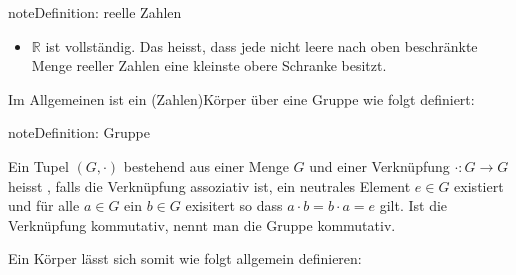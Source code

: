 \documentclass[letterpaper,10pt,english]{jupyterBook}
\begin{document}
\begin{sphinxadmonition}{note}{Definition: reelle Zahlen}
\begin{itemize}
\begin{itemize}
\begin{enumerate}
\item {} 
Für je zwei Elemente \(x,y \in\mathbb{R}\) gilt
\begin{equation*}
\begin{split}x \le y\quad \text{oder}\quad y\le x.\end{split}
\end{equation*}
\end{enumerate}

\item {} 
Die Ordnung ist verträglich mit Addition und Multiplikation, d.h. für \(a,b,c\in\mathbb{R}\) gilt

\end{itemize}
\begin{equation*}
\begin{split}\begin{array}{c}
  a \le b \Rightarrow a+c \le b+c\\
  a \le b, 0 \le c \Rightarrow a\cdot c \le b\cdot c
  \end{array}\end{split}
\end{equation*}
\item {} 
\(\mathbb{R}\) ist vollständig. Das heisst, dass jede nicht leere nach oben beschränkte Menge reeller Zahlen eine kleinste obere Schranke besitzt.

\end{itemize}
\end{sphinxadmonition}

Im Allgemeinen ist ein (Zahlen)\sphinxhyphen{}Körper über eine Gruppe wie folgt definiert:

\begin{sphinxadmonition}{note}{Definition: Gruppe}

Ein Tupel \((G, \cdot)\) bestehend aus einer Menge \(G\) und einer Verknüpfung \(\cdot : G \to G\) heisst , falls die Verknüpfung assoziativ ist, ein neutrales Element \(e\in G\) existiert und für alle \(a \in G\) ein \(b\in G\) exisitert so dass \(a\cdot b = b\cdot a = e\) gilt. Ist die Verknüpfung kommutativ, nennt man die Gruppe kommutativ.
\end{sphinxadmonition}

Ein Körper lässt sich somit wie folgt allgemein definieren:
\end{document}
